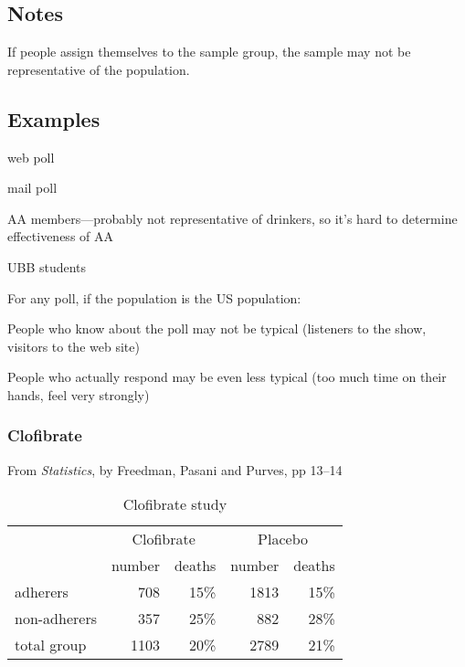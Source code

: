 \documentclass[landscape]{exam}
\begin{document}
  \subsection{Notes}
  If people assign themselves to the sample group, the sample may not be
  representative of the population.
  
  \subsection{Examples}

  \begin{itemize*}
    \item web poll
    \item mail poll
    \item AA members---probably not representative of drinkers, so it's hard to
      determine effectiveness of AA
    \item UBB students
  \end{itemize*}

  For any poll, if the population is the US population:
  \begin{itemize*}
    \item People who know about the poll may not be typical (listeners to the
      show, visitors to the web site)
    \item People who actually respond may be even less typical (too much time on
      their hands, feel very strongly)
  \end{itemize*}

  \subsubsection{Clofibrate}

  From {\em Statistics}, by Freedman, Pasani and Purves, pp 13--14

  \begin{table}
    \centering
    \begin{tabular}{lrrrr}
      \toprule
      & \multicolumn{2}{c}{Clofibrate} & \multicolumn{2}{c}{Placebo} \\
                   & number & deaths & number & deaths \\
      \cmidrule(r){2-3} \cmidrule(r){4-5}    
      adherers     & 708    & 15\%   & 1813   & 15\% \\
      non-adherers & 357    & 25\%   & 882    & 28\% \\
      total group  & 1103   & 20\%   & 2789   & 21\% \\
      \bottomrule
    \end{tabular}
    \caption{Clofibrate study}\label{tab:clofibrate}
  \end{table}
\end{document}
